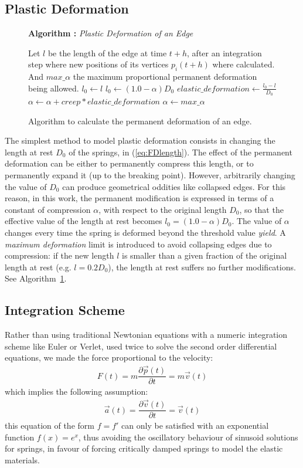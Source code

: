 \documentclass[journal]{IEEEtran}
\newcommand{\eref}[1]{(\ref{#1})}
\newcommand{\alref}[1]{Algorithm~\ref{#1}}
\newcounter{algorithm}
\newenvironment{algorithmicieee}[1]
  {\refstepcounter{algorithm}
   \begin{lrbox}{\ieeealgbox}
   \begin{minipage}{\dimexpr\columnwidth-2\fboxsep-2\fboxrule}
   \textbf{Algorithm \arabic{algorithm}:} \textit{#1} \par
   \begin{algorithmic}[1]}
  {\end{algorithmic}
   \end{minipage}
   \end{lrbox}\noindent\fbox{\usebox{\ieeealgbox}}}
\begin{document}
\subsection{Plastic Deformation}
\begin{figure}
 \begin{algorithmicieee}{Plastic Deformation of an Edge}\label{alg:deformEdge}
\STATE Let $l$ be the length of the edge at time $t+h$, after an integration step where new positions of its vertices $p_i(t+h)$ where calculated. And $max\_\alpha$ the maximum proportional permanent deformation being allowed.
  \STATE $l_0 \gets l$
 \ELSE
  \STATE $l_0 \gets (1.0 - \alpha) D_0$
 \ENDIF
 \STATE $elastic\_deformation \gets \frac{l_0 - l}{D_0}$
  \STATE $\alpha \gets \alpha + creep * elastic\_deformation$
   \STATE $\alpha \gets max\_\alpha$
  \ENDIF
 \ENDIF
 \end{algorithmicieee}
\caption{Algorithm to calculate the permanent deformation of an edge.}
\end{figure}

The simplest method to model plastic deformation consists in changing the length at rest $D_0$ of the springs, in \eref{eq:FDlength}.  The effect of the permanent deformation can be either to permanently compress this length, or to permanently expand it (up to the breaking point).  However, arbitrarily changing the value of $D_0$ can produce geometrical oddities like collapsed edges.  For this reason, in this work, the permanent modification is expressed in terms of a constant of compression $\alpha$, with respect to the original length $D_0$, so that the effective value of the length at rest becomes $l_0 = (1.0 - \alpha) D_0$.  The value of $\alpha$ changes every time the spring is deformed beyond the threshold value \textit{yield}.  A \textit{maximum deformation} limit is introduced to avoid collapsing edges due to compression: if the new length $l$ is smaller than a given fraction of the original length at rest (e.g. $l=0.2 D_0$), the length at rest suffers no further modifications.  See \alref{alg:deformEdge}.

\subsection{Integration Scheme}
\label{sec:ischeme}
Rather than using traditional Newtonian equations with a numeric integration scheme like Euler or Verlet, used twice to solve the second order differential equations, we made the force proportional to the velocity:
\begin{align}
 F(t) = m\dfrac{\partial \vec{p}(t)}{\partial t} = m \vec{v}(t)
\end{align}
which implies the following assumption:
\begin{align}
 \vec{a}(t) = \dfrac{\partial \vec{v}(t)}{\partial t} = \vec{v}(t)
\end{align}
this equation of the form $f=f'$ can only be satisfied with an exponential function $f(x)=e^x$, thus avoiding the oscillatory behaviour of sinusoid solutions for springs, in favour of forcing critically damped springs to model the elastic materials.
\end{document}
